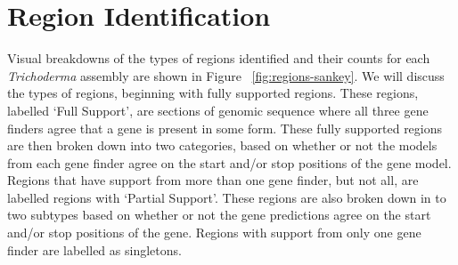 \section{Region Identification}
\label{section:regions}

Visual breakdowns of the types of regions identified and their counts
for each \textit{Trichoderma} assembly are shown in Figure
~\ref{fig:regions-sankey}. We will discuss the types of regions,
beginning with fully supported regions. These regions, labelled `Full
Support', are sections of genomic sequence where all three gene
finders agree that a gene is present in some form. These fully
supported regions are then broken down into two categories, based on
whether or not the models from each gene finder agree on the start
and/or stop positions of the gene model. Regions that have support
from more than one gene finder, but not all, are labelled regions with
`Partial Support'. These regions are also broken down in to two
subtypes based on whether or not the gene predictions agree on the
start and/or stop positions of the gene. Regions with support from
only one gene finder are labelled as singletons.

